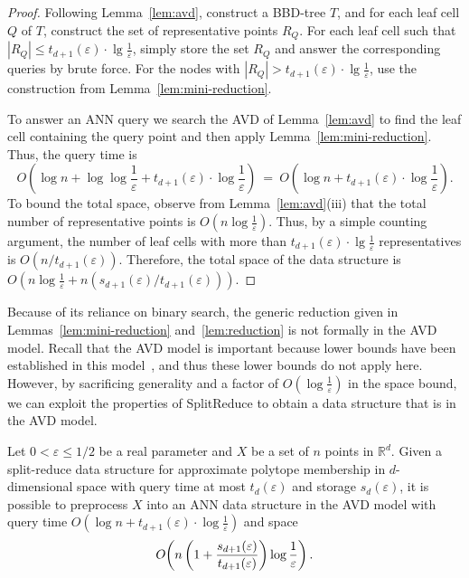 \documentclass[11pt]{article}   \usepackage[letterpaper,hmargin=2.1cm,vmargin=3cm]{geometry}
\newcommand{\RE}{\mathbb{R}}    \newcommand{\ZZ}{\mathbb{Z}}    \newcommand{\eps}{\varepsilon}  \newcommand{\ST}{\,:\,}         \newcommand{\sq}{\square}
\newcommand{\OO}[1]{O\kern-2pt\left(#1\right)}  \newcommand{\half}[1]{\frac{#1}{2}}
\newcommand{\inv}[1]{\frac{1}{#1}}
\newcommand{\alg}{\textrm{SplitReduce}}
\begin{document}
\begin{proof}
Following Lemma~\ref{lem:avd}, construct a BBD-tree $T$, and for each leaf cell $Q$ of $T$, construct the set of representative points $R_Q$. For each leaf cell such that $|R_Q| \leq t_{d+1}(\eps) \cdot \lg \inv{\eps}$, simply store the set $R_Q$ and answer the corresponding queries by brute force. For the nodes with $|R_Q| > t_{d+1}(\eps) \cdot \lg \inv{\eps}$, use the construction from Lemma~\ref{lem:mini-reduction}. 

To answer an ANN query we search the AVD of Lemma~\ref{lem:avd} to find the leaf cell containing the query point and then apply Lemma~\ref{lem:mini-reduction}. Thus, the query time is 
\[
	O\left(\log n + \log \log \inv{\eps} + t_{d+1}(\eps) \cdot \log \inv{\eps}\right) 
		~ = ~ O\left(\log n + t_{d+1}(\eps) \cdot \log \inv{\eps}\right).
\]
To bound the total space, observe from Lemma~\ref{lem:avd}(iii) that the total number of representative points is $O(n \log \inv{\eps})$. Thus, by a simple counting argument, the number of leaf cells with more than $t_{d+1}(\eps) \cdot \lg \inv{\eps}$ representatives is $O(n/t_{d+1}(\eps))$. Therefore, the total space of the data structure is $O(n \log \inv{\eps} + n (s_{d+1}(\eps)/t_{d+1}(\eps)))$.
\end{proof}


Because of its reliance on binary search, the generic reduction given in Lemmas~\ref{lem:mini-reduction} and~\ref{lem:reduction} is not formally in the AVD model. Recall that the AVD model is important because lower bounds have been established in this model~\cite{AVD-JACM}, and thus these lower bounds do not apply here. However, by sacrificing generality and a factor of $O(\log \inv{\eps})$ in the space bound, we can exploit the properties of {\alg} to obtain a data structure that is in the AVD model.

\begin{lemma} \label{lem:avd-model}
Let $0 < \eps \leq 1/2$ be a real parameter and $X$ be a set of $n$ points in $\RE^d$. Given a split-reduce data structure for approximate polytope membership in $d$-dimensional space with query time at most $t_{d}(\eps)$ and storage $s_{d}(\eps)$, it is possible to preprocess $X$ into an ANN data structure in the AVD model with query time $O(\log n + t_{d+1}(\eps) \cdot \log \inv{\eps})$ and space
\[
	\OO{n \left( 1 + \frac{s_{d+1}(\eps)}{t_{d+1}(\eps)} \right) \log \inv{\eps}}.
\]
\end{lemma}
\end{document}
